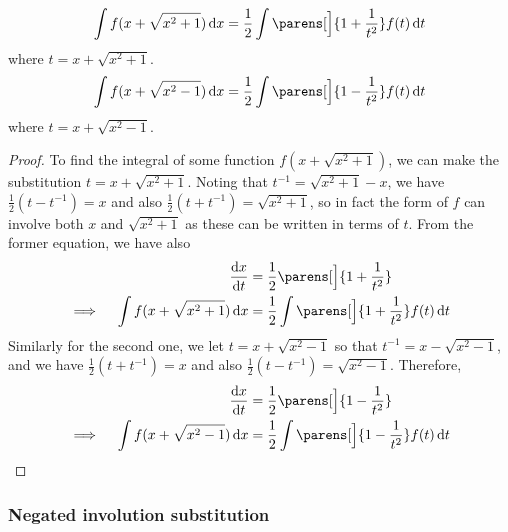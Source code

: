 \begin{theorem}
 \begin{equation*}
  \integ{f(x + \sqrt{x^2 + 1})}{x}
  = \frac 12 \integ{\parens[\Big]{1 + \frac 1{t^2}}f(t)}{t}
 \end{equation*}
 where \(t = x + \sqrt{x^2 + 1}\).
 \begin{equation*}
  \integ{f(x + \sqrt{x^2 - 1})}{x}
  = \frac 12 \integ{\parens[\Big]{1 - \frac 1{t^2}}f(t)}{t}
 \end{equation*}
 where \(t = x + \sqrt{x^2 - 1}\).
\end{theorem}
\begin{proof}
 To find the integral of some function \(f(x + \sqrt{x^2 + 1})\), we can make
 the substitution \(t = x + \sqrt{x^2 + 1}\). Noting that
 \(t^{-1} = \sqrt{x^2 + 1} - x\), we have \(\frac 12(t - t^{-1}) = x\)
 and also \(\frac 12(t + t^{-1}) = \sqrt{x^2 + 1}\), so in fact the form of
 \(f\) can involve both \(x\) and \(\sqrt{x^2 + 1}\) as these can be
 written in terms of \(t\). From the former equation, we have also
 \begin{alignat*}{2}
  && \dv<x>{t} &= \frac 12\parens[\Big]{1 + \frac 1{t^2}} \\
  \implies{}&& \integ{f(x + \sqrt{x^2 + 1})}{x}
  &= \frac 12 \integ{\parens[\Big]{1 + \frac 1{t^2}}f(t)}{t}
 \end{alignat*}
 Similarly for the second one, we let \(t = x + \sqrt{x^2 - 1}\) so that
 \(t^{-1} = x - \sqrt{x^2 - 1}\), and we have \(\frac 12(t + t^{-1}) = x\)
 and also \(\frac 12(t - t^{-1}) = \sqrt{x^2 - 1}\). Therefore,
 \begin{alignat*}{2}
  && \dv<x>{t} &= \frac 12\parens[\Big]{1 - \frac 1{t^2}} \\
  \implies{}&& \integ{f(x + \sqrt{x^2 - 1})}{x}
  &= \frac 12 \integ{\parens[\Big]{1 - \frac 1{t^2}}f(t)}{t} \qedhere
 \end{alignat*}
\end{proof}

\subsubsection{Negated involution substitution}

